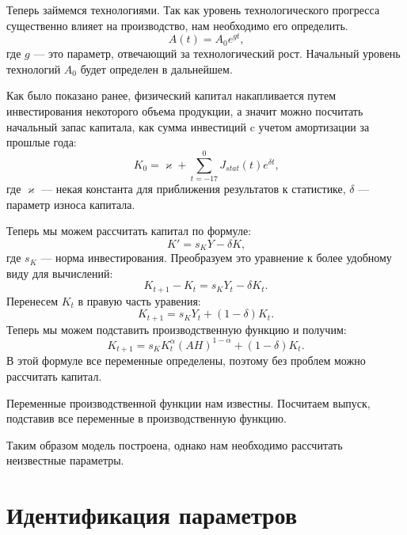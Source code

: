 Теперь займемся технологиями.
Так как уровень технологического прогресса существенно влияет на производство, нам необходимо его определить.
\begin{equation*}
A(t) = A_{0}e^{gt}\text{,}
\end{equation*}
где $g$ --- это параметр, отвечающий за технологический рост.
Начальный уровень технологий $A_0$ будет определен в дальнейшем.

Как было показано ранее, физический капитал накапливается путем инвестирования некоторого объема продукции, а значит можно посчитать начальный запас капитала, как сумма инвестиций c учетом амортизации за прошлые года:
\begin{equation*}
	K_0= \varkappa + \sum\limits_{t = -17}^{0}J_{stat}(t) e^{\delta t}\text{,}
\end{equation*}
где $\varkappa$ --- некая константа для приближения результатов к статистике, $\delta$ --- параметр износа капитала.

Теперь мы можем рассчитать капитал по формуле:
\begin{equation*}
	K'=s_{K}Y - \delta K \text{,}
\end{equation*}
где $s_{K}$ --- норма инвестирования.
Преобразуем это уравнение к более удобному виду для вычислений:
\begin{equation*}
	K_{t+1} - K_{t} = s_{K}Y_t - \delta K_{t}\text{.}
\end{equation*}
Перенесем $K_{t}$ в правую часть уравения:
\begin{equation*}
K_{t+1} = s_{K} Y_t + (1 - \delta)K_{t}\text{.}
\end{equation*}
Теперь мы можем подставить производственную функцию и получим:
\begin{equation*}
	K_{t+1} = s_{K}K_{t}^{\alpha}(AH)^{1-\alpha} + (1 - \delta)K_{t}\text{.}
\end{equation*}
В этой формуле все переменные определены, поэтому без проблем можно рассчитать капитал.

Переменные производственной функции нам известны.
Посчитаем выпуск, подставив все переменные в производственную функцию.

Таким образом модель построена, однако нам необходимо рассчитать неизвестные параметры.

\section{Идентификация параметров}

